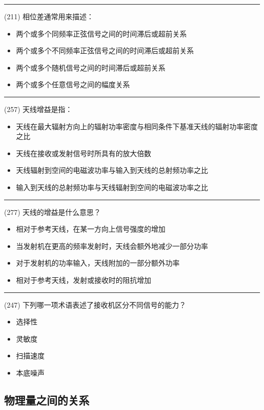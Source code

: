 \documentclass[twocolumn,hyperref,UTF8]{ctexart}  %
\begin{document}
\noindent\rule{0.5\textwidth}{1pt}
\heiti (211) 相位差通常用来描述： \songti {\color{gray} [LK0529] }
\begin{itemize}
	\item  两个或多个同频率正弦信号之间的时间滞后或超前关系
	\item  两个或多个不同频率正弦信号之间的时间滞后或超前关系
	\item  两个或多个随机信号之间的时间滞后或超前关系
	\item  两个或多个任意信号之间的幅度关系
\end{itemize}


\noindent\rule{0.5\textwidth}{1pt}
\heiti (257) 天线增益是指： \songti {\color{gray} [LK0926] }
\begin{itemize}
	\item  天线{\color{LimeGreen}在最大辐射方向上}的辐射功率密度与相同条件下基准天线的辐射功率密度之比
	\item  天线在接收或发射信号时所具有的放大倍数
	\item  天线辐射到空间的电磁波功率与输入到天线的总射频功率之比
	\item  输入到天线的总射频功率与天线辐射到空间的电磁波功率之比
\end{itemize}


\noindent\rule{0.5\textwidth}{1pt}
\heiti (277) 天线的增益是什么意思？ \songti {\color{gray} [LK1216] }
\begin{itemize}
	\item  相对于参考天线，{\color{LimeGreen}在某一方向上}信号强度的增加
	\item  当发射机在更高的频率发射时，天线会额外地减少一部分功率
	\item  对于发射机的功率输入，天线附加的一部分额外功率
	\item  相对于参考天线，发射或接收时的阻抗增加
\end{itemize}


\noindent\rule{0.5\textwidth}{1pt}
\heiti (247) 下列哪一项术语表述了接收机区分不同信号的能力？ \songti {\color{gray} [LK1177] }
\begin{itemize}
	\item  选择性
	\item  灵敏度
	\item  扫描速度
	\item  本底噪声
\end{itemize}


\clearpage
\subsection{物理量之间的关系}
\end{document}
